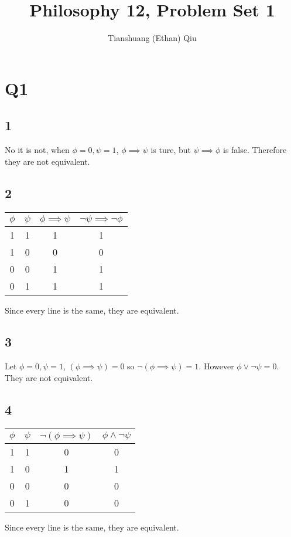 \documentclass[12pt]{article}
\author{Tianshuang (Ethan) Qiu}
\begin{document}
\title{Philosophy 12, Problem Set 1}
\maketitle

\section{Q1}
\subsection{1}
No it is not, when $\phi = 0, \psi = 1$, $\phi \implies \psi$ is ture,
but $\psi \implies \phi$ is false. Therefore they are not equivalent.

\subsection{2}
\begin{tabular}{ | c | c | c | c|}
    \hline
    $\phi$ & $\psi$ & $\phi \implies \psi$ & $\neg\psi \implies \neg\phi$\\
    \hline
    1 & 1 & 1 & 1 \\
    \hline
    1 & 0 & 0 & 0 \\
    \hline
    0 & 0 & 1 & 1 \\
    \hline
    0 & 1 & 1 & 1 \\
    \hline
\end{tabular}
\newline
Since every line is the same, they are equivalent.

\subsection{3}
Let $\phi = 0, \psi = 1$, $(\phi \implies \psi) = 0$ so $\neg (\phi \implies \psi) = 1$.
However $\phi \lor \neg \psi = 0$. They are not equivalent.

\subsection{4}
\begin{tabular}{ | c | c | c | c|}
    \hline
    $\phi$ & $\psi$ & $\neg(\phi \implies \psi)$ & $\phi \land \neg \psi$\\
    \hline
    1 & 1 & 0 & 0 \\
    \hline
    1 & 0 & 1 & 1 \\
    \hline
    0 & 0 & 0 & 0 \\
    \hline
    0 & 1 & 0 & 0 \\
    \hline
\end{tabular}
\newline
Since every line is the same, they are equivalent.
\end{document}
